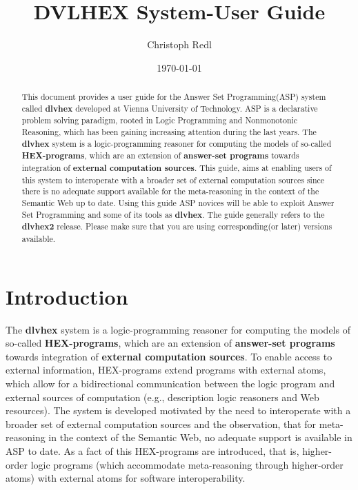 \documentclass[14pt,a4paper, titlepage]{article}
\begin{document}
\setcounter{page}{3}
\title{DVLHEX System-User Guide}
\author{Christoph Redl}
\date{\today}
\maketitle


\begin{abstract}
This document provides a user guide for the Answer Set Programming(ASP) system called \textbf{dlvhex} developed at Vienna University of Technology. ASP is a declarative problem solving paradigm, rooted in Logic Programming and Nonmonotonic Reasoning, which has been gaining increasing attention during the last years. The \textbf{dlvhex} system   is a logic-programming reasoner for computing the models of so-called \textbf{HEX-programs}, which are an extension of \textbf{answer-set programs} towards integration of \textbf{external computation sources}. This guide, aims at enabling users of this system to interoperate with a broader set of external computation sources since there is no adequate support available for the meta-reasoning in the context of the Semantic Web up to date. Using this guide ASP novices will be able to exploit Answer Set Programming and some of its tools as \textbf{dlvhex}. The guide generally refers to the \textbf{dlvhex2} release. Please make sure that you are using corresponding(or later) versions available.     
\end{abstract}


\tableofcontents

\newpage

\section{Introduction} %
The \textbf{dlvhex} system is a logic-programming reasoner for computing the models of so-called \textbf{HEX-programs}, which are an extension of \textbf{answer-set programs} towards integration of \textbf{external computation sources}. To enable access to external information, HEX-programs extend programs with external atoms, which allow for a bidirectional communication between the logic program and external sources of computation (e.g., description logic reasoners and Web resources). \cite{extatoms} The system is developed motivated by the need to interoperate with a broader set of external computation sources and the observation, that for meta-reasoning in the context of the Semantic Web, no adequate support is available in ASP to date. As a fact of this HEX-programs are introduced, that is, higher-order logic programs (which accommodate meta-reasoning through higher-order atoms) with external atoms for software interoperability.
\end{document}
